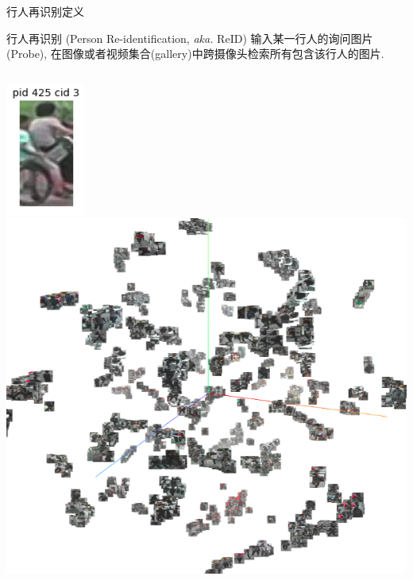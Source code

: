 \documentclass[notes]{beamer}
\begin{document}
\begin{frame}
	{行人再识别定义}
	\begin{block}{行人再识别 (Person Re-identification, \textit{aka.} ReID)}
		输入某一行人的询问图片(Probe), 在图像或者视频集合(gallery)中跨摄像头检索所有包含该行人的图片.
	\end{block}
	\begin{columns}
		\centering
		\includegraphics[width=0.5\linewidth]{2018-03-12-10-05-13.png}
		\centering
		\includegraphics[width=0.72\linewidth]{2018-03-12-09-57-11.png}
	\end{columns}
\end{frame}
\end{document}
